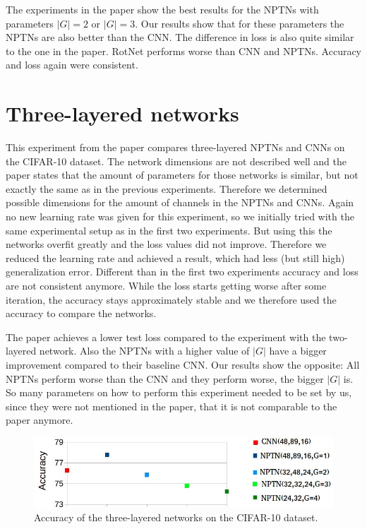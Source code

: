 \documentclass{llncs}
\begin{document}
The experiments in the paper show the best results for the NPTNs with parameters $|G|=2$ or $|G|=3$. Our results show that for these parameters the NPTNs are also better than the CNN. The difference in loss is also quite similar to the one in the paper. RotNet performs worse than CNN and NPTNs. Accuracy and loss again were consistent. 

\section{Three-layered networks}
This experiment from the paper compares three-layered NPTNs and CNNs on the CIFAR-10 \cite{CIFAR} dataset. 
The network dimensions are not described well and the paper states that the amount of parameters for those networks is similar, but not exactly the same as in the previous experiments. 
Therefore we determined possible dimensions for the amount of channels in the NPTNs and CNNs. 
Again no new learning rate was given for this experiment, so we initially tried with the same experimental setup as in the first two experiments. But using this the networks overfit greatly and the loss values did not improve. 
Therefore we reduced the learning rate and achieved a result, which had less (but still high) generalization error. 
Different than in the first two experiments accuracy and loss are not consistent anymore. While the loss starts getting worse after some iteration, the accuracy stays approximately stable and we therefore used the accuracy to compare the networks.

The paper achieves a lower test loss compared to the experiment with the two-layered network. Also the NPTNs with a higher value of $|G|$ have a bigger improvement compared to their baseline CNN. Our results show the opposite: All NPTNs perform worse than the CNN and they perform worse, the bigger $|G|$ is.
So many parameters on how to perform this experiment needed to be set by us, since they were not mentioned in the paper, that it is not comparable to the paper anymore.

\begin{figure}
	\begin{center}
	\includegraphics[scale=0.35]{result_images/experiment3_2.jpg}
	\caption{Accuracy of the three-layered networks on  the CIFAR-10 dataset.}
	\label{pic:experiment3}
	\end{center}
\end{figure}
\end{document}
